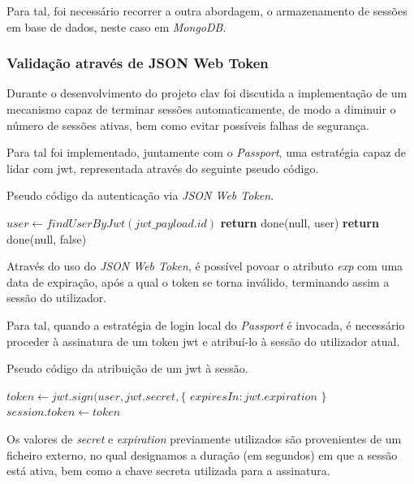 Para tal, foi necessário recorrer a outra abordagem, o armazenamento de sessões em base de dados, neste caso em \emph{MongoDB}.

\subsubsection{Validação através de JSON Web Token} \label{jwt_1}

Durante o desenvolvimento do projeto \gls{clav} foi discutida a implementação de um mecanismo capaz de terminar sessões automaticamente, de modo a diminuir o número de sessões ativas, bem como evitar possíveis falhas de segurança.

Para tal foi implementado, juntamente com o \emph{Passport}, uma estratégia capaz de lidar com \gls{jwt}, representada através do seguinte pseudo código.

\begin{algorithm}
    \caption{Pseudo código da autenticação via \emph{JSON Web Token}.}
    \begin{algorithmic}[1]
        \State $user \gets findUserByJwt(jwt\_payload.id)$
            \State \textbf{return} done(null, user)
        \Else
            \State \textbf{return} done(null, false)
        \EndIf
    \EndFunction
    \end{algorithmic}
\end{algorithm}

Através do uso do \emph{JSON Web Token}, é possível povoar o atributo \emph{exp} com uma data de expiração, após a qual o token se torna inválido, terminando assim a sessão do utilizador.

Para tal, quando a estratégia de login local do \emph{Passport} é invocada, é necessário proceder à assinatura de um token \gls{jwt} e atribuí-lo à sessão do utilizador atual.

\begin{algorithm}
    \caption{Pseudo código da atribuição de um \gls{jwt} à sessão.}
    \begin{algorithmic}[1]
        \State $token \gets jwt.sign({user}, jwt.secret, \{$
        \State \indent $expiresIn : jwt.expiration$
        \State $\}$
        \State $session.token \gets token$
    \EndFunction
    \end{algorithmic}
\end{algorithm}

Os valores de \emph{secret} e \emph{expiration} previamente utilizados são provenientes de um ficheiro externo, no qual designamos a duração (em segundos) em que a sessão está ativa, bem como a chave secreta utilizada para a assinatura.

